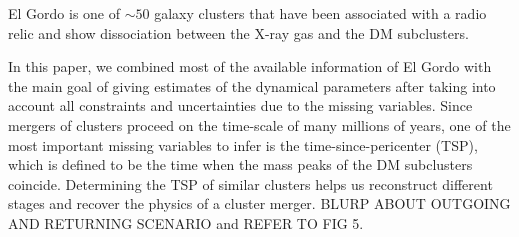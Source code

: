 \documentclass[letterpaper,useAMS,usenatbib]{mn2e}
\begin{document}
El Gordo is one of $\sim 50$ galaxy clusters that have
been associated with a radio relic and show dissociation between the X-ray
gas and the DM subclusters. \par 
In this paper, we combined most of the available information of El Gordo
with the main goal of giving estimates of
the dynamical parameters after taking into account all
constraints and uncertainties due to the missing variables.
Since mergers of clusters proceed on the time-scale of many millions of
years, one of the most important missing variables to infer is the
time-since-pericenter (TSP), which is defined to be the time when the mass
peaks of the DM subclusters coincide.
Determining the TSP of similar clusters helps
us reconstruct different stages and recover the physics of a cluster merger.
BLURP ABOUT OUTGOING AND RETURNING SCENARIO and REFER TO FIG 5.
\end{document}
